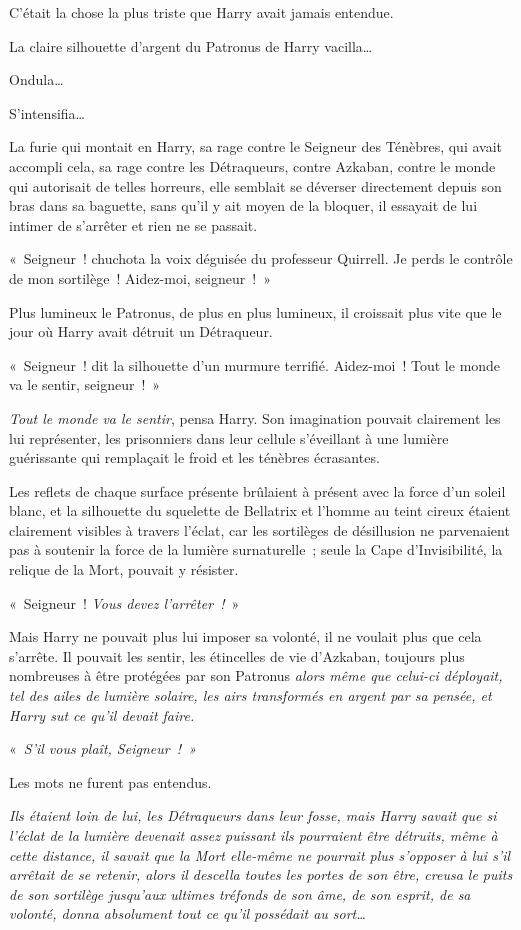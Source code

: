 C'était la chose la plus triste que Harry avait jamais entendue.

La claire silhouette d'argent du Patronus de Harry vacilla…

Ondula…

S'intensifia…

La furie qui montait en Harry, sa rage contre le Seigneur des Ténèbres, qui avait accompli cela, sa rage contre les Détraqueurs, contre Azkaban, contre le monde qui autorisait de telles horreurs, elle semblait se déverser directement depuis son bras dans sa baguette, sans qu'il y ait moyen de la bloquer, il essayait de lui intimer de s'arrêter et rien ne se passait.

«~Seigneur~! chuchota la voix déguisée du professeur Quirrell.
Je perds le contrôle de mon sortilège~!
Aidez-moi, seigneur~!~»

Plus lumineux le Patronus, de plus en plus lumineux, il croissait plus vite que le jour où Harry avait détruit un Détraqueur.

«~Seigneur~! dit la silhouette d'un murmure terrifié.
Aidez-moi~!
Tout le monde va le sentir, seigneur~!~»

\emph{Tout le monde va le sentir}, pensa Harry.
Son imagination pouvait clairement les lui représenter, les prisonniers dans leur cellule s'éveillant à une lumière guérissante qui remplaçait le froid et les ténèbres écrasantes.

Les reflets de chaque surface présente brûlaient à présent avec la force d'un soleil blanc, et la silhouette du squelette de Bellatrix et l'homme au teint cireux étaient clairement visibles à travers l'éclat, car les sortilèges de désillusion ne parvenaient pas à soutenir la force de la lumière surnaturelle~; seule la Cape d'Invisibilité, la relique de la Mort, pouvait y résister.

«~Seigneur~!
\emph{Vous devez l'arrêter~!}~»

Mais Harry ne pouvait plus lui imposer sa volonté, il ne voulait plus que cela s'arrête.
Il pouvait les sentir, les étincelles de vie d'Azkaban, toujours plus nombreuses à être protégées par son Patronus \emph{alors même que celui-ci déployait, tel des ailes de lumière solaire, les airs transformés en argent par sa pensée, et Harry sut ce qu'il devait faire.}

«~\emph{S'il vous plaît, Seigneur~!~»}

Les mots ne furent pas entendus.

\emph{Ils étaient loin de lui, les Détraqueurs dans leur fosse, mais Harry savait que si l'éclat de la lumière devenait assez puissant ils pourraient être détruits, même à cette distance, il savait que la Mort elle-même ne pourrait plus s'opposer à lui s'il arrêtait de se retenir, alors il descella toutes les portes de son être, creusa le puits de son sortilège jusqu'aux ultimes tréfonds de son âme, de son esprit, de sa volonté, donna absolument tout ce qu'il possédait au sort…}

